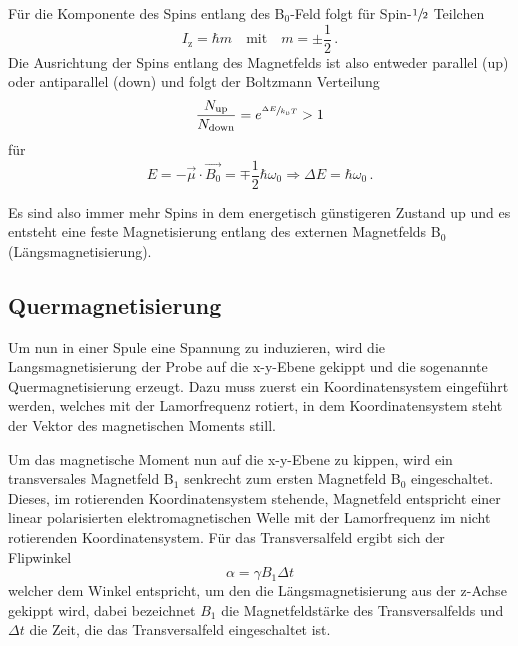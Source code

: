 Für die Komponente des Spins entlang des B$_{0}$-Feld folgt für Spin-$\sfrac{1}{2}$ Teilchen
\begin{equation*}
  I_\text{z} = \hbar m \quad \text{mit} \quad m = \pm\frac{1}{2} \, .
\end{equation*}
Die Ausrichtung der Spins entlang des Magnetfelds ist also entweder parallel (up) oder antiparallel (down) und
folgt der Boltzmann Verteilung
\begin{equation*}
  \frac{N_\text{up}}{N_\text{down}} = e^{\sfrac{\Delta E}{k_\text{B} T}} > 1
\end{equation*}
für
\begin{equation*}
  E = - \vec{\mu} \cdot \vec{B_0} = \mp \frac{1}{2} \hbar \omega_0 \Rightarrow \Delta E = \hbar \omega_0 \, .
\end{equation*}

Es sind also immer mehr Spins in dem energetisch günstigeren Zustand up und es entsteht eine feste Magnetisierung entlang des externen Magnetfelds B$_0$ (Längsmagnetisierung).


\subsection{Quermagnetisierung}

Um nun in einer Spule eine Spannung zu induzieren, wird die Langsmagnetisierung der Probe auf die x-y-Ebene gekippt und die sogenannte Quermagnetisierung erzeugt.
Dazu muss zuerst ein Koordinatensystem eingeführt werden, welches mit der Lamorfrequenz rotiert, in dem Koordinatensystem steht der Vektor des magnetischen Moments still.

Um das magnetische Moment nun auf die x-y-Ebene zu kippen, wird ein transversales Magnetfeld B$_1$ senkrecht zum ersten Magnetfeld B$_0$ eingeschaltet. Dieses, im rotierenden Koordinatensystem stehende, Magnetfeld entspricht einer linear polarisierten elektromagnetischen Welle mit der Lamorfrequenz im nicht rotierenden Koordinatensystem.
Für das Transversalfeld ergibt sich der Flipwinkel
\begin{equation*}
  \alpha = \gamma B_1 \Delta t
\end{equation*}
welcher dem Winkel entspricht, um den die Längsmagnetisierung aus der z-Achse gekippt wird, dabei bezeichnet $B_1$ die Magnetfeldstärke des Transversalfelds und $\Delta t$ die Zeit, die das Transversalfeld eingeschaltet ist.

